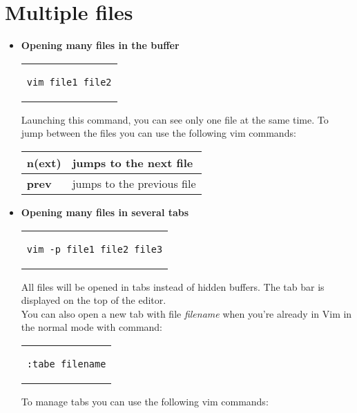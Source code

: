 \clearpage
\section{Multiple files}
\begin{itemize}
\item{\textbf{Opening many files in the buffer}\\
\begin{center}
\begin{tabular}{c}
\begin{lstlisting}[linewidth=80pt, basicstyle=\footnotesize\sffamily,]
vim file1 file2
\end{lstlisting}
\end{tabular}
\end{center}
Launching this command, you can see only one file at the same time. To jump between the files you can use the following vim commands:
\begin{table}[h]
\centering
\footnotesize
\begin{tabular}{|l|l|}
\hline
\textbf{n(ext)} & {jumps to the next file}\\
\hline
\textbf{prev} & {jumps to the previous file}\\
\hline
\end{tabular}
\end{table}
}
\item{\textbf{Opening many files in several tabs}\\
\begin{center}
\begin{tabular}{c}
\begin{lstlisting}[linewidth=130pt, basicstyle=\footnotesize\sffamily,]
vim -p file1 file2 file3
\end{lstlisting}
\end{tabular}
\end{center}
All files will be opened in tabs instead of hidden buffers. The tab bar is displayed on the top of the editor.\\
You can also open a new tab with file \textit{filename} when you're already in Vim in the normal mode with command:
\begin{center}
\begin{tabular}{c}
\begin{lstlisting}[linewidth=80pt, basicstyle=\footnotesize\sffamily,]
:tabe filename
\end{lstlisting}
\end{tabular}
\end{center}
To manage tabs you can use the following vim commands:
}
\end{itemize}
